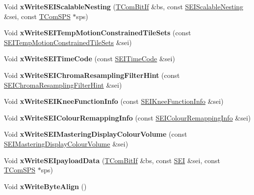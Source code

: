 \begin{DoxyCompactItemize}
\item 
\mbox{\label{class_s_e_i_writer_aebea68c96cc7ce571449d015ee2371b0}} 
Void {\bfseries x\+Write\+S\+E\+I\+Scalable\+Nesting} (\hyperlink{class_t_com_bit_if}{T\+Com\+Bit\+If} \&bs, const \hyperlink{class_s_e_i_scalable_nesting}{S\+E\+I\+Scalable\+Nesting} \&sei, const \hyperlink{class_t_com_s_p_s}{T\+Com\+S\+PS} $\ast$sps)
\item 
\mbox{\label{class_s_e_i_writer_aad5da4da258eaa326f35ff0519b72c0f}} 
Void {\bfseries x\+Write\+S\+E\+I\+Temp\+Motion\+Constrained\+Tile\+Sets} (const \hyperlink{class_s_e_i_temp_motion_constrained_tile_sets}{S\+E\+I\+Temp\+Motion\+Constrained\+Tile\+Sets} \&sei)
\item 
\mbox{\label{class_s_e_i_writer_aa675ca5dd7985e9b3dfa2975851f8954}} 
Void {\bfseries x\+Write\+S\+E\+I\+Time\+Code} (const \hyperlink{class_s_e_i_time_code}{S\+E\+I\+Time\+Code} \&sei)
\item 
\mbox{\label{class_s_e_i_writer_a863665f13b61c0bc72ec7fbc660006bf}} 
Void {\bfseries x\+Write\+S\+E\+I\+Chroma\+Resampling\+Filter\+Hint} (const \hyperlink{class_s_e_i_chroma_resampling_filter_hint}{S\+E\+I\+Chroma\+Resampling\+Filter\+Hint} \&sei)
\item 
\mbox{\label{class_s_e_i_writer_a77c66af5f9ca517886219ac203a25405}} 
Void {\bfseries x\+Write\+S\+E\+I\+Knee\+Function\+Info} (const \hyperlink{class_s_e_i_knee_function_info}{S\+E\+I\+Knee\+Function\+Info} \&sei)
\item 
\mbox{\label{class_s_e_i_writer_a3ce427868505cd25270e49c78cc62b91}} 
Void {\bfseries x\+Write\+S\+E\+I\+Colour\+Remapping\+Info} (const \hyperlink{class_s_e_i_colour_remapping_info}{S\+E\+I\+Colour\+Remapping\+Info} \&sei)
\item 
\mbox{\label{class_s_e_i_writer_a140970522ce834ad62da16f1d9e6b893}} 
Void {\bfseries x\+Write\+S\+E\+I\+Mastering\+Display\+Colour\+Volume} (const \hyperlink{class_s_e_i_mastering_display_colour_volume}{S\+E\+I\+Mastering\+Display\+Colour\+Volume} \&sei)
\item 
\mbox{\label{class_s_e_i_writer_ae6c53d8a4192c379103ced7db84cebd3}} 
Void {\bfseries x\+Write\+S\+E\+Ipayload\+Data} (\hyperlink{class_t_com_bit_if}{T\+Com\+Bit\+If} \&bs, const \hyperlink{class_s_e_i}{S\+EI} \&sei, const \hyperlink{class_t_com_s_p_s}{T\+Com\+S\+PS} $\ast$sps)
\item 
\mbox{\label{class_s_e_i_writer_a63d2097594561b7671d81dabd9eb6982}} 
Void {\bfseries x\+Write\+Byte\+Align} ()
\end{DoxyCompactItemize}
